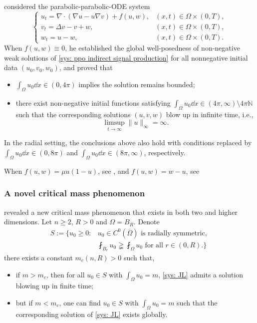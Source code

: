 
\begin{frame}
 considered the parabolic-parabolic-ODE system
\begin{equation}\label{sys: ppo indirect signal production}
	\begin{cases}
		u_t = \nabla\cdot(\nabla u - u\nabla v) + f(u,w), & (x, t)\in \Omega\times(0, T),\\
		v_t = \Delta v - v + w, & (x, t)\in \Omega\times(0, T),\\
		w_t = u - w, & (x, t)\in \Omega\times(0, T).
	\end{cases}
\end{equation}
When \(f(u,w)\equiv0\), he established  the global well-posedness of non-negative weak solutions of \eqref{sys: ppo indirect signal production} for all nonnegative initial data $(u_0,v_0,w_0)$, and proved that
\begin{itemize}
\item $\int_\Omega u_0\dd{x}\in(0, 4\pi)$ implies the solution remains bounded;
\item there exist non-negative initial functions satisfying $\int_\Omega u_0\dd{x}\in(4\pi,\infty)\setminus4\pi\mathbb{N}$ such that the corresponding solutions $(u,v,w)$ blow up in infinite time, i.e., $$\limsup_{t\to\infty}\|{u}\|_{\infty}=\infty.$$
\end{itemize}
In the radial setting, the conclusions above also hold with conditions replaced by $\int_\Omega u_0\dd{x}\in(0, 8\pi)$ and $\int_\Omega u_0\dd{x}\in(8\pi, \infty)$, respectively.

When \(f(u,w)=\mu u(1-u)\), see , and \(f(u,w) = w - u\), see 
\end{frame}


\begin{frame}
\frametitle{A novel critical mass phenomenon}
 revealed a new critical mass phenomenon that exists in both two and higher dimensions. Let $n\geqslant 2$, $R>0$ and $\Omega=B_R$. Denote
\begin{align*}
	S:=\biggl\{u_0\geqslant0 : &u_0\in C^0(\overline{\Omega}) \text{ is radially symmetric, } \\ &\fint_{B_r}u_0\gneqq \fint_{\Omega}u_0 \text{ for all } r\in(0, R).\biggr\}
\end{align*}
there exists a constant $m_c(n, R) > 0$ such that, 
\begin{itemize}
    \item if $m>m_c$, then for \alert{all}
$u_0\in S$
with $\int_\Omega u_0 = m$, 
 \eqref{sys: JL} admits a solution blowing up in finite time; 
    \item but if $m<m_c$, one can find $u_0\in S$ with $\int_\Omega u_0 = m$ such that the corresponding solution of \eqref{sys: JL} exists globally.
 \end{itemize}
\end{frame}

